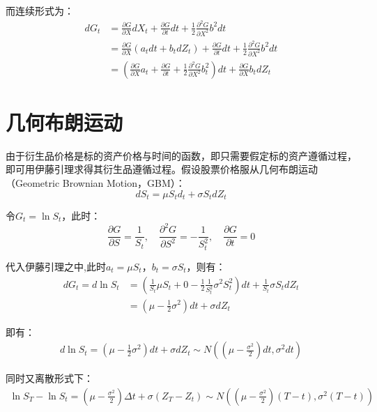 \documentclass[11pt]{article}
\begin{document}
而连续形式为：
\begin{align*}
    dG_t & = \frac{\partial G}{\partial X}  dX_t + \frac{\partial G}{\partial t} dt + \frac{1}{2} \frac{\partial^2 G}{\partial X^2} b^2 dt \\
    & = \frac{\partial G}{\partial X} (a_t dt + b_t dZ_t) + \frac{\partial G}{\partial t} dt + \frac{1}{2} \frac{\partial^2 G}{\partial X^2} b^2 dt \\
    & = \left(\frac{\partial G}{\partial X}a_t  + \frac{\partial G}{\partial t} + \frac{1}{2}\frac{\partial^2 G}{\partial X^2} b^2_t \right)dt + \frac{\partial G}{\partial X} b_t dZ_t
\end{align*}


\section{几何布朗运动}

由于衍生品价格是标的资产价格与时间的函数，即只需要假定标的资产遵循过程，即可用伊藤引理求得其衍生品遵循过程。假设股票价格服从几何布朗运动（Geometric Brownian Motion，GBM）：
\begin{equation*}
    dS_t = \mu S_t d_t + \sigma S_t dZ_t
\end{equation*}

令$G_t = \ln S_t$，此时：
\begin{equation*}
    \frac{\partial G}{\partial S} = \frac{1}{S_t}, \quad
    \frac{\partial^2 G}{\partial S^2} = -\frac{1}{S_t^2}, \quad
    \frac{\partial G}{\partial t} = 0
\end{equation*}

代入伊藤引理之中,此时$a_t=\mu S_t$，$b_t=\sigma S_t$，则有：
\begin{align*}
    dG_t = d \ln S_t & = \left( \frac{1}{S_t}\mu S_t + 0 - \frac{1}{2} \frac{1}{S_t^2} \sigma^2 S_t^2 \right) dt + \frac{1}{S_t}\sigma S_t dZ_t \\
    & = \left( \mu - \frac{1}{2}\sigma^2\right)dt + \sigma dZ_t
\end{align*}

即有：
\begin{align*}
    d\ln S_t= \left( \mu - \frac{1}{2}\sigma^2\right) dt + \sigma dZ_t \sim N \left( (\mu-\frac{\sigma^2}{2})dt, \sigma^2 dt \right)
\end{align*}

同时又离散形式下：
\begin{align*}
    \ln S_T - \ln S_t = \left( \mu - \frac{\sigma^2}{2} \right) \Delta t + \sigma (Z_T - Z_t) \sim N \left((\mu-\frac{\sigma^2}{2})(T-t), \sigma^2(T-t) \right)
\end{align*}
\end{document}
